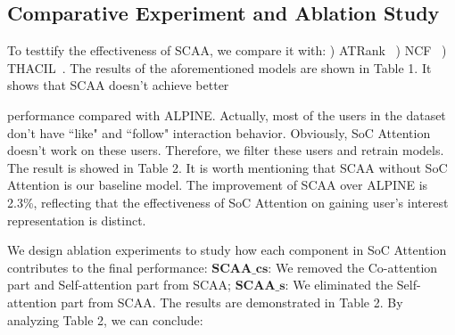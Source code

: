 \documentclass[letterpaper]{article} %
\begin{document}
	\subsection{Comparative Experiment and Ablation Study}
	To testtify the effectiveness of SCAA, we compare it with: 
	) ATRank~\cite{atrank} ) NCF~\cite{ncf} ) THACIL~\cite{thacil}. The results of the 
	aforementioned models are shown in Table 1. 
	It shows that SCAA doesn't achieve better 
	\begin{table}[htb]
		\centering
		\caption{Performance of SCAA, ALPINE and other models 
		} 
	\end{table}
	performance compared with ALPINE. Actually, most of the users in the dataset don't have ``like" and ``follow" interaction behavior. Obviously, SoC Attention doesn't work on these users. Therefore, we filter these users and retrain models. The result is showed in Table 2. It is worth mentioning that SCAA without SoC Attention is our baseline model. The improvement of SCAA over 
	ALPINE is 2.3\%, reflecting that the effectiveness of SoC Attention on gaining user's interest representation is distinct.     
	\begin{table}[t]
		
		
		\centering
	\caption{Performance of the original ALPINE, SCAA and several variants on the filtered dataset }
	\end{table}
	We design ablation experiments to study how each component in SoC Attention contributes to the final performance: $\textbf{SCAA\_cs:}$ We removed the Co-attention part and Self-attention part from SCAA; $\textbf{SCAA\_s:}$ We eliminated the Self-attention part from SCAA. The results are demonstrated in Table 2. By analyzing Table 2, we can conclude:	
	
\end{document}
